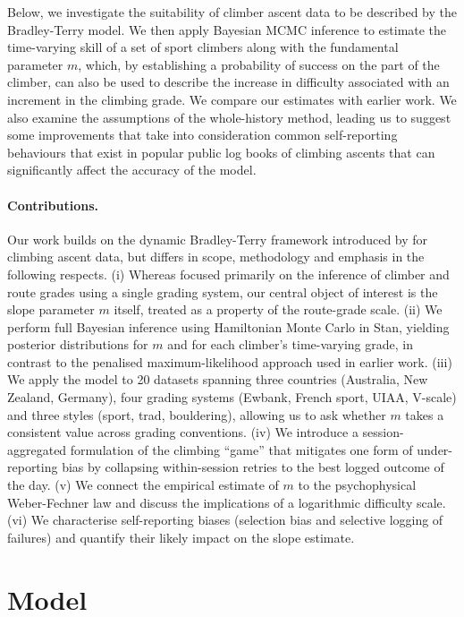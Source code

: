 \documentclass[12pt]{article}
\begin{document}
Below, we investigate the suitability of climber ascent data to be described by the Bradley-Terry model.  We then apply Bayesian MCMC inference to estimate the time-varying skill of a set of sport climbers along with the fundamental parameter $m$, which, by establishing a probability of success on the part of the climber, can also be used to describe the increase in difficulty associated with an increment in the climbing grade.  We compare our estimates with earlier work.  We also examine the assumptions of the whole-history method, leading us to suggest some improvements that take into consideration common self-reporting behaviours that exist in popular public log books of climbing ascents that can significantly affect the accuracy of the model.

\paragraph{Contributions.} Our work builds on the dynamic Bradley-Terry framework introduced by \citet{scarff2020estimation} for climbing ascent data, but differs in scope, methodology and emphasis in the following respects. (i) Whereas \citet{scarff2020estimation} focused primarily on the inference of climber and route grades using a single grading system, our central object of interest is the slope parameter $m$ itself, treated as a property of the route-grade scale. (ii) We perform full Bayesian inference using Hamiltonian Monte Carlo in Stan, yielding posterior distributions for $m$ and for each climber's time-varying grade, in contrast to the penalised maximum-likelihood approach used in earlier work. (iii) We apply the model to 20 datasets spanning three countries (Australia, New Zealand, Germany), four grading systems (Ewbank, French sport, UIAA, V-scale) and three styles (sport, trad, bouldering), allowing us to ask whether $m$ takes a consistent value across grading conventions. (iv) We introduce a session-aggregated formulation of the climbing ``game'' that mitigates one form of under-reporting bias by collapsing within-session retries to the best logged outcome of the day. (v) We connect the empirical estimate of $m$ to the psychophysical Weber-Fechner law and discuss the implications of a logarithmic difficulty scale. (vi) We characterise self-reporting biases (selection bias and selective logging of failures) and quantify their likely impact on the slope estimate.

\section{Model}
\end{document}
